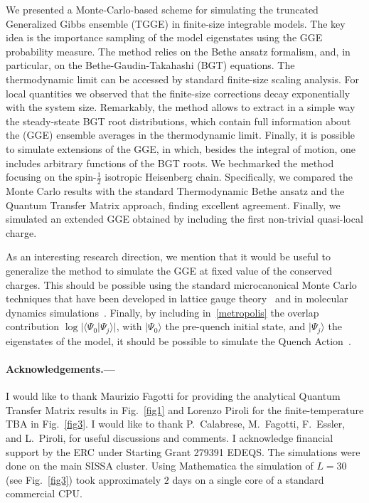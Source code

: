\documentclass[twocolumn,superscriptaddress,prb,10pt]{revtex4-1}
\begin{document}
We presented a Monte-Carlo-based scheme for simulating the truncated Generalized 
Gibbs ensemble (TGGE) in finite-size integrable models. The key idea is the importance 
sampling of the model eigenstates using the GGE probability measure. The method relies 
on the Bethe ansatz formalism, and, in particular, on the Bethe-Gaudin-Takahashi (BGT) 
equations. The thermodynamic limit can be accessed by standard finite-size scaling analysis. 
For local quantities we observed that the finite-size corrections decay exponentially 
with the system size. 
Remarkably, the method allows to extract in a simple way the steady-steate BGT root 
distributions, which contain full information about the (GGE) ensemble averages 
in the thermodynamic limit. Finally, it is possible to simulate extensions of 
the GGE, in which, besides the integral of motion, one includes arbitrary functions 
of the BGT roots. We bechmarked the method focusing on the spin-$\frac{1}{2}$ isotropic 
Heisenberg chain. Specifically, we compared the Monte Carlo results with the standard  
Thermodynamic Bethe ansatz and the Quantum Transfer Matrix approach, finding excellent 
agreement. Finally, we simulated an extended GGE obtained by including the first non-trivial 
quasi-local charge. 

As an interesting research direction, we mention that it would be useful to generalize the 
method to simulate the GGE at fixed value of the conserved charges. This should be possible 
using the standard microcanonical Monte Carlo techniques that have been developed in lattice 
gauge theory~\cite{creutz-1983} and in molecular dynamics simulations~\cite{lustig-1998}. 
Finally, by including in~\eqref{metropolis} the overlap contribution 
$\log|\langle\Psi_0|\Psi_j\rangle|$, with $|\Psi_0\rangle$ the pre-quench initial state, 
and $|\Psi_j\rangle$ the eigenstates of the model,  it should be possible to simulate the 
Quench Action~\cite{prep}.

\paragraph*{Acknowledgements.---}
I would like to thank Maurizio Fagotti for providing the analytical Quantum Transfer Matrix 
results in Fig.~\ref{fig1} and Lorenzo Piroli for the finite-temperature TBA in Fig.~\ref{fig3}. 
I would like to thank P.~Calabrese, M.~Fagotti, F.~Essler, and L.~Piroli,  for useful 
discussions and comments. I acknowledge financial support by the ERC under Starting 
Grant 279391 EDEQS. The simulations were done on the main SISSA cluster. Using Mathematica 
the simulation of $L=30$ (see Fig.~\ref{fig3}) took approximately $2$ days on a single core 
of a standard commercial CPU. 
\end{document}

